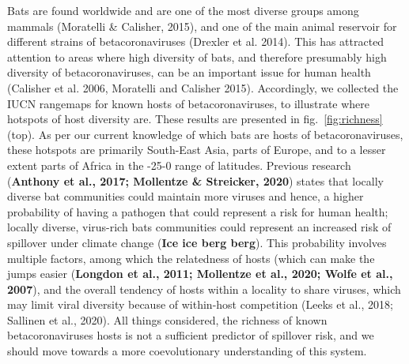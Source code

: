 \documentclass[10pt,oneside]{article}
\begin{document}
Bats are found worldwide and are one of the most diverse groups among
mammals (Moratelli \& Calisher, 2015), and one of the main animal
reservoir for different strains of betacoronaviruses (Drexler et al.
2014). This has attracted attention to areas where high diversity of
bats, and therefore presumably high diversity of betacoronaviruses, can
be an important issue for human health (Calisher et al. 2006, Moratelli
and Calisher 2015). Accordingly, we collected the IUCN rangemaps for
known hosts of betacoronaviruses, to illustrate where hotspots of host
diversity are. These results are presented in fig.~\ref{fig:richness}
(top). As per our current knowledge of which bats are hosts of
betacoronaviruses, these hotspots are primarily South-East Asia, parts
of Europe, and to a lesser extent parts of Africa in the -25-0 range of
latitudes. Previous research (\textbf{Anthony et al., 2017; Mollentze \&
Streicker, 2020}) states that locally diverse bat communities could
maintain more viruses and hence, a higher probability of having a
pathogen that could represent a risk for human health; locally diverse,
virus-rich bats communities could represent an increased risk of
spillover under climate change (\textbf{Ice ice berg berg}). This
probability involves multiple factors, among which the relatedness of
hosts (which can make the jumps easier (\textbf{Longdon et al., 2011;
Mollentze et al., 2020; Wolfe et al., 2007}), and the overall tendency
of hosts within a locality to share viruses, which may limit viral
diversity because of within-host competition (Leeks et al., 2018;
Sallinen et al., 2020). All things considered, the richness of known
betacoronaviruses hosts is not a sufficient predictor of spillover risk,
and we should move towards a more coevolutionary understanding of this
system.
\end{document}
